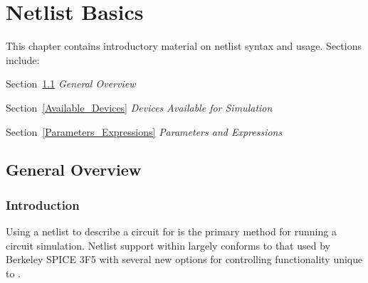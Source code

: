 


\chapter{Netlist Basics}
\label{Netlist_Basics}

{
This chapter contains introductory material on netlist syntax and usage.
Sections include:
\begin{XyceItemize}
\item Section~\ref{General_Overview} \emph{General Overview}
\item Section~\ref{Available_Devices} \emph{Devices Available for Simulation}
\item Section~\ref{Parameters_Expressions} \emph{Parameters and Expressions}
\end{XyceItemize}
}

\section{General Overview}
\label{General_Overview}

\subsection{Introduction}

Using a netlist to describe a circuit for \Xyce{} is the primary method for running a circuit
simulation.  Netlist support within \Xyce{}
largely conforms to that used by Berkeley SPICE 3F5 with
several new options for controlling functionality unique to \Xyce{}.

